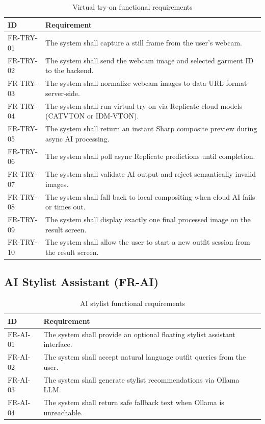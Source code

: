 \begin{table}[H]
  \centering
  \caption{Virtual try-on functional requirements}
  \label{tab:fr-tryon}
  \small
  \begin{tabular}{@{}p{1.5cm}p{12cm}@{}}
    \toprule
    \textbf{ID} & \textbf{Requirement} \\
    \midrule
    FR-TRY-01 & The system shall capture a still frame from the user's webcam. \\
    FR-TRY-02 & The system shall send the webcam image and selected garment ID to the backend. \\
    FR-TRY-03 & The system shall normalize webcam images to data URL format server-side. \\
    FR-TRY-04 & The system shall run virtual try-on via Replicate cloud models (CATVTON or IDM-VTON). \\
    FR-TRY-05 & The system shall return an instant Sharp composite preview during async AI processing. \\
    FR-TRY-06 & The system shall poll async Replicate predictions until completion. \\
    FR-TRY-07 & The system shall validate AI output and reject semantically invalid images. \\
    FR-TRY-08 & The system shall fall back to local compositing when cloud AI fails or times out. \\
    FR-TRY-09 & The system shall display exactly one final processed image on the result screen. \\
    FR-TRY-10 & The system shall allow the user to start a new outfit session from the result screen. \\
    \bottomrule
  \end{tabular}
\end{table}

\subsection{AI Stylist Assistant (FR-AI)}

\begin{table}[H]
  \centering
  \caption{AI stylist functional requirements}
  \label{tab:fr-ai}
  \small
  \begin{tabular}{@{}p{1.5cm}p{12cm}@{}}
    \toprule
    \textbf{ID} & \textbf{Requirement} \\
    \midrule
    FR-AI-01 & The system shall provide an optional floating stylist assistant interface. \\
    FR-AI-02 & The system shall accept natural language outfit queries from the user. \\
    FR-AI-03 & The system shall generate stylist recommendations via Ollama LLM. \\
    FR-AI-04 & The system shall return safe fallback text when Ollama is unreachable. \\
    \bottomrule
  \end{tabular}
\end{table}

